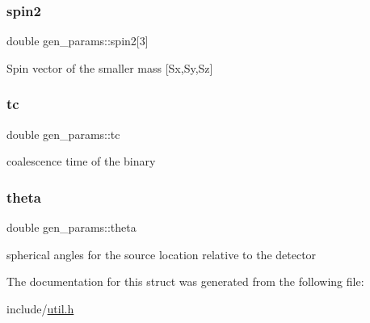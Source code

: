 \subsubsection{\texorpdfstring{spin2}{spin2}}
{\footnotesize\ttfamily double gen\+\_\+params\+::spin2\mbox{[}3\mbox{]}}

Spin vector of the smaller mass \mbox{[}Sx,Sy,Sz\mbox{]} \mbox{\label{structgen__params_ac033c43dad8b5480a2d619e7b62ca1a5}} 
\subsubsection{\texorpdfstring{tc}{tc}}
{\footnotesize\ttfamily double gen\+\_\+params\+::tc}

coalescence time of the binary \mbox{\label{structgen__params_a72da7de5a25ede0a8e168d70f596ee94}} 
\subsubsection{\texorpdfstring{theta}{theta}}
{\footnotesize\ttfamily double gen\+\_\+params\+::theta}

spherical angles for the source location relative to the detector 

The documentation for this struct was generated from the following file\+:\begin{DoxyCompactItemize}
\item 
include/\hyperlink{util_8h}{util.\+h}\end{DoxyCompactItemize}
